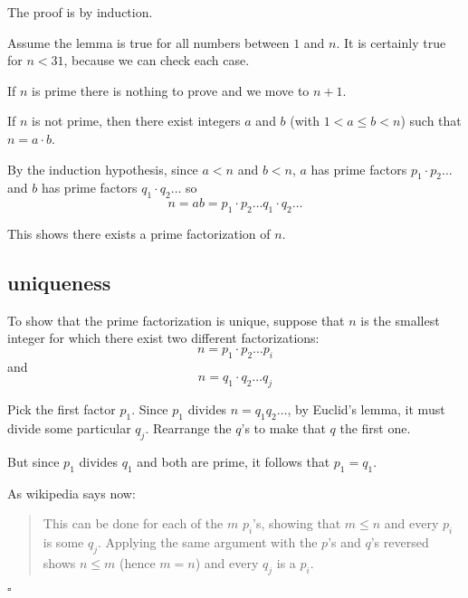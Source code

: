 \documentclass[11pt, oneside]{article}
\begin{document}
The proof is by induction.

Assume the lemma is true for all numbers between $1$ and $n$. It is certainly true for $n < 31$, because we can check each case.

If $n$ is prime there is nothing to prove and we move to $n + 1$.

If $n$ is not prime, then there exist integers $a$ and $b$ (with $1 < a \le b < n$) such that $n = a \cdot b$.

By the induction hypothesis, since $a < n$ and $b < n$, $a$ has prime factors $p_1 \cdot p_2 \dots$ and $b$ has prime factors $q_1 \cdot q_2 \dots$ so
\[ n = ab = p_1 \cdot p_2 \dots  q_1 \cdot q_2 \dots \]

This shows there exists a prime factorization of $n$.

\subsection*{uniqueness}

To show that the prime factorization is unique, suppose that $n$ is the smallest integer for which there exist two different factorizations:
\[ n = p_1 \cdot p_2 \dots p_i \]
and
\[ n = q_1 \cdot q_2 \dots q_j \]

Pick the first factor $p_1$.  Since $p_1$ divides $n = q_1 q_2 \dots$, by Euclid's lemma, it must divide some particular $q_j$.  Rearrange the $q$'s to make that $q$ the first one.

But since $p_1$ divides $q_1$ and both are prime, it follows that $p_1 = q_1$.

As wikipedia says now:

\begin{quote}This can be done for each of the $m$ $p_i$'s, showing that $m \le n$ and every $p_i$ is some $q_j$.  Applying the same argument with the $p$'s and $q$'s reversed shows $n \le m$ (hence $m = n$) and every $q_j$ is a $p_i$.\end{quote}

$\square$
\end{document}
